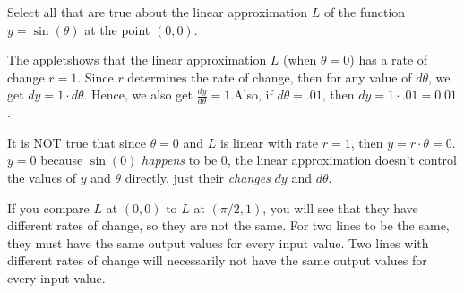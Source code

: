 \documentclass{ximera}
\begin{document}
\begin{question}
    \begin{prompt}
        Select all that are true about the linear approximation $L$ of the function $y=\sin(\theta)$ at the point $(0,0)$.
    \begin{selectAll}
    \end{selectAll}
    \begin{feedback}
        The appletshows that the linear approximation $L$ (when $\theta=0$) has a rate of change $r=1$. Since $r$ determines the rate of change, then for any value of $d\theta$, we get $dy=1\cdot d\theta$. Hence, we also get $\frac{dy}{d\theta}=1$.Also, if $d\theta=.01$, then $dy=1\cdot .01=0.01$.

        It is NOT true that since $\theta=0$ and $L$ is linear with rate $r=1$, then $y=r\cdot\theta=0$. $y=0$ because $\sin(0)$ \emph{happens} to be $0$, the linear approximation doesn't control the values of $y$ and $\theta$ directly, just their \emph{changes} $dy$ and $d\theta$.

        If you compare $L$ at $(0,0)$ to $L$ at $(\pi/2,1)$, you will see that they have different rates of change, so they are not the same. For two lines to be the same, they must have the same output values for every input value. Two lines with different rates of change will necessarily not have the same output values for every input value.
    \end{feedback}
    \end{prompt}
\end{question}
\end{document}

